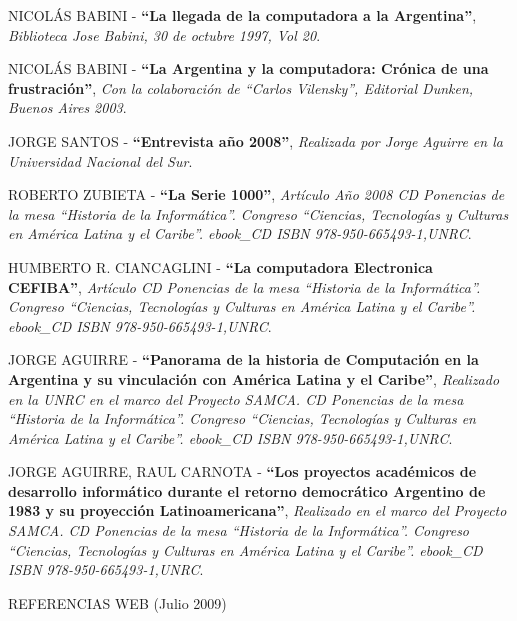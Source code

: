 \documentclass[%
  	final,
%
	notitlepage,
	narroweqnarray,
	inline,
 	twoside,
	]{ieee}
\newcommand{\link}[1]{\textit{#1}}
\newcommand{\ibiblio}[3]{
	\uppercase{#1} - \textbf{``#2''}, \link{#3}.
}
\begin{document}
\begin{thebibliography}{1}

 \ibiblio{Nicol\'as Babini}{La llegada de la computadora a la Argentina}{Biblioteca Jose Babini, 30 de octubre 1997, Vol 20}
 \ibiblio{Nicol\'as Babini}{La Argentina y la computadora: Cr\'onica de una frustraci\'on}
{Con la colaboraci\'on de ``Carlos Vilensky'', Editorial Dunken, Buenos Aires 2003}
 \ibiblio{Jorge Santos}{Entrevista a\~no 2008}{Realizada por Jorge Aguirre en la Universidad Nacional del Sur}
 \ibiblio{Roberto Zubieta}{La Serie 1000}{Art\'iculo A\~no 2008 CD Ponencias de la mesa ``Historia de la Inform\'atica''. Congreso ``Ciencias, Tecnolog\'ias y Culturas en Am\'erica Latina y el Caribe''. ebook\_CD ISBN 978-950-665493-1,UNRC}
 \ibiblio{Humberto R. Ciancaglini}{La computadora Electronica CEFIBA}{Art\'iculo CD Ponencias de la mesa ``Historia de la Inform\'atica''. Congreso ``Ciencias, Tecnolog\'ias y Culturas en Am\'erica Latina y el Caribe''. ebook\_CD ISBN 978-950-665493-1,UNRC}
 \ibiblio{Jorge Aguirre}{Panorama de la historia de Computaci\'on en la Argentina y su vinculaci\'on con Am\'erica Latina y el Caribe}{Realizado en la UNRC en el marco del Proyecto SAMCA. CD Ponencias de la mesa ``Historia de la Inform\'atica''. Congreso ``Ciencias, Tecnolog\'ias y Culturas en Am\'erica Latina y el Caribe''. ebook\_CD ISBN 978-950-665493-1,UNRC}
 \ibiblio{Jorge Aguirre, Raul Carnota}{Los proyectos acad\'emicos de desarrollo inform\'atico durante el retorno democr\'atico Argentino de 1983 y su proyecci\'on Latinoamericana}{Realizado en el marco del Proyecto SAMCA. CD Ponencias de la mesa ``Historia de la Inform\'atica''. Congreso ``Ciencias, Tecnolog\'ias y Culturas en Am\'erica Latina y el Caribe''. ebook\_CD ISBN 978-950-665493-1,UNRC}\\


\begin{center}REFERENCIAS WEB (Julio 2009)\end{center}


\end{thebibliography}
\end{document}
